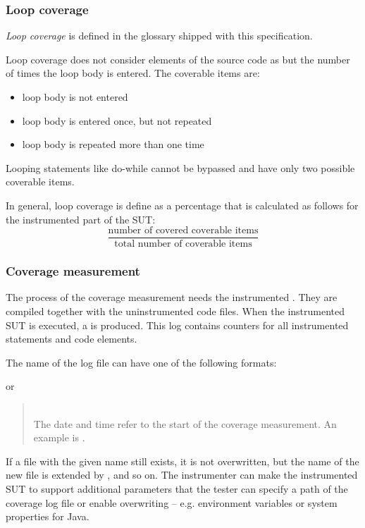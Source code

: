 \subsubsection{Loop coverage}\label{fr:Loop coverage}
\textit{Loop coverage} is defined in the glossary shipped with this specification.
\par
Loop coverage does not consider elements of the source code as  but the number of times the loop body is entered. The coverable items are:
\begin{itemize}
  \item loop body is not entered
  \item loop body is entered once, but not repeated
  \item loop body is repeated more than one time
\end{itemize}
Looping statements like do-while cannot be bypassed and have only two possible coverable items.
\par
In general, loop coverage is define as a percentage that is calculated as follows for the instrumented part of the SUT:
\begin{equation*}
\frac{\text{number of covered coverable items}}{\text{total number of coverable items}}
\end{equation*}

\subsubsection{Coverage measurement} \label{fr: Coverage measurement}
The process of the coverage measurement needs the instrumented . They are compiled together with the uninstrumented code files. When the instrumented SUT is executed, a  is produced. This log contains counters for all instrumented statements and code elements.
\par
The name of the log file can have one of the following formats:
\begin{quote}
\end{quote}
or
\begin{quote}
\\
The date and time refer to the start of the coverage measurement. An example is .
\end{quote}
\par
If a file with the given name still exists, it is not overwritten, but the name of the new file is extended by ,  and so on. The instrumenter can make the instrumented SUT to support additional parameters that the tester can specify a path of the coverage log file or enable overwriting -- e.g. environment variables or system properties for Java.


